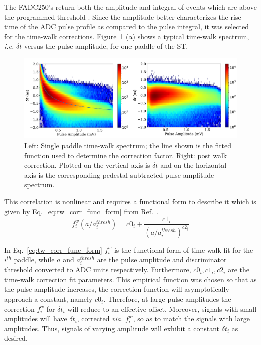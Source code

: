 The FADC250's return both the amplitude and integral of events which are above the programmed threshold \cite{dong_fadc}.  Since the amplitude better characterizes the rise time of the ADC pulse profile as compared to the pulse integral, it was selected for the time-walk corrections.  Figure~\ref{fig:time_walk} (a) shows a typical time-walk spectrum, \textit{i.e.} $\delta t$ versus the pulse amplitude, for one paddle of the ST.
	\begin{figure}[!htb]
		\centering
		\includegraphics[width=1.0\textwidth]{calibration/figs/TW_correction.pdf}
		\caption{Left: Single paddle time-walk spectrum; the line shown is the fitted function used to determine the correction factor. Right: post walk correction.  Plotted on the vertical axis is $\delta t$ and on the horizontal axis is the corresponding pedestal subtracted pulse amplitude spectrum.  }
		\label{fig:time_walk}
	\end{figure}
This correlation is nonlinear and requires a functional form to describe it which is given by Eq.~\ref{eq:tw_corr_func_form} from Ref.~\cite{esmith_bcal}.
	\begin{equation} \label{eq:tw_corr_func_form}
		f^{w}_{i}\left(a/a^{thresh}_{i}\right) = c0_{i} + \frac{c1_{i}}{(a/a^{thresh}_{i})^{c2_{i}}}
	\end{equation}

In Eq.~\ref{eq:tw_corr_func_form} $f^{w}_{i}$ is the functional form of time-walk fit for the $i^{th}$ paddle, while $a$ and $a^{thresh}_{i}$ are the pulse amplitude and discriminator threshold converted to ADC units respectively.  Furthermore, $c0_{i}, c1_{i}, c2_{i}$ are the time-walk correction fit parameters.  This empirical function was chosen so that as the pulse amplitude increases, the correction function will asymptotically approach a constant, namely $c0_{i}$.  Therefore, at large pulse amplitudes the correction $f^{w}_{i}$ for $\delta t_{i}$ will reduce to an effective offset.  Moreover, signals with small amplitudes will have $\delta t_{i}$, corrected \textit{via.} $f^{w}_{i}$, so as to match the signals with large amplitudes.  Thus, signals of varying amplitude will exhibit a constant $\delta t_{i}$ as desired.

